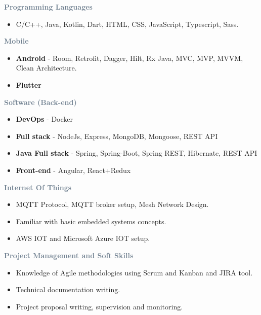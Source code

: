 
\textcolor{SlateGrey}{\textbf{Programming Languages}}
\newline

\begin{itemize}
    \item C/C++, Java, Kotlin, Dart, HTML, CSS, JavaScript, Typescript, Sass.
\end{itemize}

\textcolor{SlateGrey}{\textbf{Mobile}}
\newline

\begin{itemize}
    \item \textbf{Android} - Room, Retrofit, Dagger, Hilt, Rx Java, MVC, MVP, MVVM, Clean Architecture.
    \item \textbf{Flutter}
\end{itemize}

		
\textcolor{SlateGrey}{\textbf{Software (Back-end)}}
\newline

\begin{itemize}
    \item \textbf{DevOps} - Docker
    \item \textbf{Full stack} - NodeJs, Express, MongoDB, Mongoose, REST API
    \item\textbf{ Java Full stack} - Spring, Spring-Boot, Spring REST, Hibernate, REST API
    \item \textbf{Front-end} - Angular, React+Redux
\end{itemize}

\textcolor{SlateGrey}{\textbf{Internet Of Things}}
\newline

\begin{itemize}
    \item MQTT Protocol, MQTT broker setup, Mesh Network Design.
    \item Familiar with basic embedded systems concepts.
    \item AWS IOT and Microsoft Azure IOT setup.
\end{itemize}

\textcolor{SlateGrey}{\textbf{Project Management and Soft Skills}}
\newline

\begin{itemize}
    \item Knowledge of Agile methodologies using Scrum and Kanban and JIRA tool.
    \item Technical documentation writing.
    \item Project proposal writing, supervision and monitoring.
\end{itemize}



